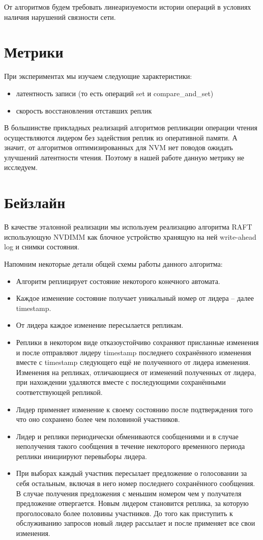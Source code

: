 \documentclass[pdftex,ptm,12pt,a4paper]{report}
\theoremstyle{definition}
\begin{document}
От алгоритмов будем требовать линеаризуемости \cite{linearizability} истории операций в условиях наличия нарушений связности сети.

\section{Метрики}
При экспериментах мы изучаем следующие характеристики:
\begin{itemize}
    \item латентность записи (то есть операций set и compare\_and\_set)
    \item скорость восстановления отставших реплик
\end{itemize}

В большинстве прикладных реализаций алгоритмов репликации операции чтения осуществляются лидером без задействия реплик из оперативной памяти.
А значит, от алгоритмов оптимизированных для NVM нет поводов ожидать улучшений латентности чтения. Поэтому в нашей работе данную метрику не исследуем.

\section{Бейзлайн}
В качестве эталонной реализации мы используем реализацию алгоритма RAFT \cite{raftpaper} использующую NVDIMM как блочное устройство
хранящую на ней write-ahead log и снимки состояния.

\label{baseline}
Напомним некоторые детали общей схемы работы данного алгоритма:
\begin{itemize}
    \item Алгоритм реплицирует состояние некоторого конечного автомата.
    \item Каждое изменение состояние получает уникальный номер от лидера -- далее timestamp.
    \item От лидера каждое изменение пересылается репликам.
    \item Реплики в некотором виде отказоустойчиво сохраняют присланные изменения и после отправляют лидеру timestamp последнего сохранённого изменения вместе с timestamp следующего ещё не
        полученного от лидера изменения. Изменения на репликах, отличающиеся от изменений полученных от лидера, при нахождении удаляются вместе
    с последующими сохранёнными соответствующей репликой.
    \item Лидер применяет изменение к своему состоянию после подтверждения того что оно сохранено более чем половиной участников.
    \item Лидер и реплики периодически обмениваются сообщениями и в случае неполучения такого сообщения в течение некоторого временного периода реплики инициируют перевыборы лидера.
    \item При выборах каждый участник пересылает предложение о голосовании за себя остальным, включая в него номер последнего сохранённого сообщения. В случае получения предложения с меньшим
    номером чем у получателя предложение отвергается. Новым лидером становится реплика, за которую проголосовало более половины участников. До того как приступить к обслуживанию
    запросов новый лидер рассылает и после применяет все свои изменения.
\end{itemize}
\end{document}
